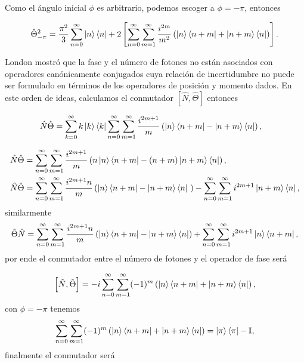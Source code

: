         Como el ángulo inicial $\phi$ es arbitrario, podemos escoger a $\phi = -\pi$, entonces

        \begin{equation}
            \hat{\Theta}_{-\pi}^2 = \frac{\pi^2}{3}\sum_{n=0}^\infty \ket{n}\bra{n} + 2 \left[ \sum_{n=0}^\infty\sum_{m=1}^\infty \frac{i^{2m}}{m^2}\left(  \ket{n}\bra{n+m} + \ket{n+m}\bra{n} \right)\right].
        \end{equation}

        London \cite{london1926jacobischen,london1927winkelvariable} mostró que la fase y el número de fotones no están asociados con operadores canónicamente conjugados cuya relación de incertidumbre no puede ser formulado en términos de los operadores de posición y momento dados. En este orden de ideas, calculamos el conmutador $\left[ \hat{N},\hat{\Theta} \right]$ entonces

        \begin{align}
            & \hat{N}\hat{\Theta} = \sum_{k=0}^\infty k \ket{k}\bra{k} \sum_{n=0}^\infty \sum_{m=1}^\infty  \frac{i^{2m+1}}{m}\left( \ket{n}\bra{n+m} - \ket{n+m}\bra{n} \right),
        \end{align}


        \begin{align}
            & \hat{N}\hat{\Theta} = \sum_{n=0}^\infty\sum_{m=1}^\infty \frac{i^{2m+1}}{m}\left( n\ket{n}\bra{n+m} - (n+m)\ket{n+m}\bra{n} \right),\\
            & \hat{N}\hat{\Theta} = \sum_{n=0}^\infty\sum_{m=1}^\infty\frac{i^{2m+1}n}{m}\left( \ket{n}\bra{n+m} - \ket{n+m}\bra{n}\ \right) - \sum_{n=0}^\infty\sum_{m=1}^\infty i^{2m+1}\ket{n+m}\bra{n},
        \end{align}
        similarmente
        \begin{equation}
            \hat{\Theta}\hat{N}= \sum_{n=0}^\infty\sum_{m=1}^\infty \frac{i^{2m+1}n}{m} \left( \ket{n}\bra{n+m}-\ket{n+m}\bra{n} \right) + \sum_{n=0}^\infty \sum_{m=1}^\infty i^{2m+1}\ket{n}\bra{n+m},
        \end{equation}
        por ende el conmutador entre el número de fotones y el operador de fase será

        \begin{equation}
            \left[ \hat{N},\hat{\Theta} \right] = -i \sum_{n=0}^\infty\sum_{m=1}^\infty (-1)^m \left( \ket{n}\bra{n+m} + \ket{n+m}\bra{n} \right),
        \end{equation}
        con $\phi = -\pi$ tenemos
        \begin{equation}
            \sum_{n=0}^\infty\sum_{m=1}^\infty(-1)^m \left( \ket{n}\bra{n+m} + \ket{n+m}\bra{n} \right) = \ket{\pi}\bra{\pi} - \mathbb{I},
        \end{equation}
        finalmente el conmutador será

